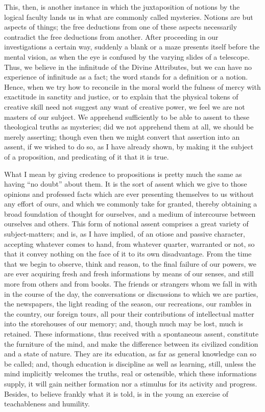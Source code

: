 This, then, is another instance in which the juxtaposition of
notions by the logical faculty lands us in what are commonly called
mysteries. Notions are but aspects of things; the free deductions from
one of these aspects necessarily contradict the free deductions from
another. After proceeding in our investigations a certain way,
suddenly a blank or a maze presents itself before the mental vision,
as when the eye is confused by the varying slides of a telescope.
Thus, we believe in the infinitude of the Divine Attributes, but we
can have no experience of infinitude as a fact; the word stands for a
definition or a notion. Hence, when we try how to reconcile in the
moral world the fulness of mercy with exactitude in sanctity and
justice, or to explain that the physical tokens of creative skill need
not suggest any want of creative power, we feel we are not masters of
our subject. We apprehend sufficiently to be able to assent to these
theological truths as mysteries; did we not apprehend them at all, we
should be merely asserting; though even then we might convert that
assertion into an assent, if we wished to do so, as I have already
shown, by making it the subject of a proposition, and predicating of
it that it is true.


What I mean by giving credence to propositions is pretty much the
same as having ``no doubt'' about them. It is the sort of
assent which we give to those opinions and professed facts which are
ever presenting themselves to us without any effort of ours, and which
we commonly take for granted, thereby obtaining a broad foundation of
thought for ourselves, and a medium of intercourse between ourselves
and others. This form of notional assent comprises a great variety of
subject-matters; and is, as I have implied, of an otiose and passive
character, accepting whatever comes to hand, from whatever quarter,
warranted or not, so that it convey nothing on the face of it to its
own disadvantage. From the time that we begin to observe, think and
reason, to the final failure of our powers, we are ever acquiring
fresh and fresh informations by means of our senses, and still more
from others and from books. The friends or strangers whom we fall in
with in the course of the day, the conversations or discussions to
which we are parties, the newspapers, the light reading of the season,
our recreations, our rambles in the country, our foreign tours, all
pour their contributions of intellectual matter into the storehouses
of our memory; and, though much may be lost, much is retained. These
informations, thus received with a spontaneous assent, constitute the
furniture of the mind, and make the difference between its civilized
condition and a state of nature. They are its education, as far as
general knowledge can so be called; and, though education is
discipline as well as learning, still, unless the mind implicitly
welcomes the truths, real or ostensible, which these informations
supply, it will gain neither formation nor a stimulus for its activity
and progress. Besides, to believe frankly what it is told, is in the
young an exercise of teachableness and humility.

